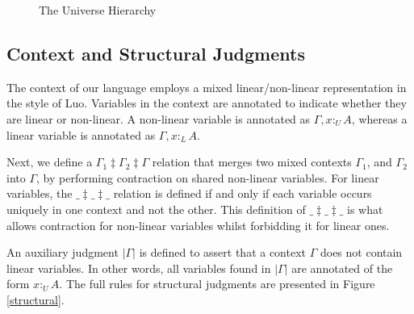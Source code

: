 \documentclass{article}
\theoremstyle{definition}
\newcommand{\pure}[1]{|#1|}
\newcommand{\utype}{:_{\scriptscriptstyle U}}
\newcommand{\ltype}{:_{\scriptscriptstyle L}}
\newcommand{\mrg}[3]{#1\ddagger#2\ddagger#3}
\begin{document}
  \begin{figure}[H]
    \caption{The Universe Hierarchy}
    \centering
    \label{universe}
  \end{figure}

  \subsection{Context and Structural Judgments}
  The context of our language employs a mixed linear/non-linear representation in the style of Luo\cite{luo}. Variables in the context are annotated to indicate whether they are linear or non-linear. A non-linear variable is annotated as $\Gamma, x \utype A$, whereas a linear variable is annotated as $\Gamma, x \ltype A$. 
  
  Next, we define a $\mrg{\Gamma_1}{\Gamma_2}{\Gamma}$ relation that merges two mixed contexts $\Gamma_1$, and $\Gamma_2$ into $\Gamma$, by performing contraction on shared non-linear variables. For linear variables, the $\mrg{\_}{\_}{\_}$ relation is defined if and only if each variable occurs uniquely in one context and not the other. This definition of $\mrg{\_}{\_}{\_}$ is what allows contraction for non-linear variables whilst forbidding it for linear ones.

  An auxiliary judgment $\pure{\Gamma}$ is defined to assert that a context $\Gamma$ does not contain linear variables. In other words, all variables found in $\pure{\Gamma}$ are annotated of the form $x \utype A$. The full rules for structural judgments are presented in Figure \ref{structural}.
  
\end{document}
